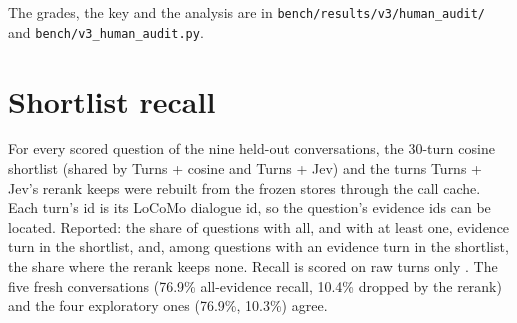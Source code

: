 \documentclass[11pt]{article}
\newcommand{\src}[1]{}
\begin{document}
The grades, the key and the analysis are in \texttt{bench/\allowbreak{}results/\allowbreak{}v3/\allowbreak{}human\_\allowbreak{}audit/\allowbreak{}} and \texttt{bench/\allowbreak{}v3\_\allowbreak{}human\_\allowbreak{}audit.py}.

\FloatBarrier
\section{Shortlist recall}\label{app:D}
For every scored question of the nine held-out conversations, the 30\src{docs/V3\_PLAN.md §1, §2, §4}-turn cosine shortlist (shared by Turns + cosine and Turns + Jev) and the turns Turns + Jev's rerank keeps were rebuilt from the frozen stores through the call cache. Each turn's id is its LoCoMo dialogue id, so the question's evidence ids can be located. Reported: the share of questions with all, and with at least one, evidence turn in the shortlist, and, among questions with an evidence turn in the shortlist, the share where the rerank keeps none. Recall is scored on raw turns only \citep{samerank2026}. The five fresh conversations (76.9\%\src{bench/results/v3/shortlist\_recall.json\#fresh\_five/all/shortlist\_recall\_all} all-evidence recall, 10.4\%\src{bench/results/v3/shortlist\_recall.json\#fresh\_five/all/rerank\_drops\_all\_shortlisted\_evidence} dropped by the rerank) and the four exploratory ones (76.9\%\src{bench/results/v3/shortlist\_recall.json\#exploratory\_four/all/shortlist\_recall\_all}, 10.3\%\src{bench/results/v3/shortlist\_recall.json\#exploratory\_four/all/rerank\_drops\_all\_shortlisted\_evidence}) agree.
\end{document}
